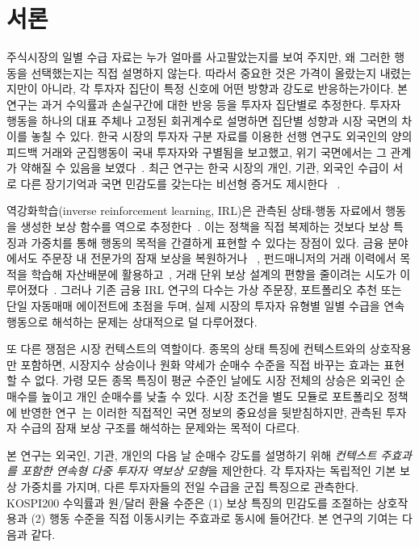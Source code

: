\documentclass[sigconf,nonacm]{acmart}
\begin{document}
\maketitle

\section{서론}

주식시장의 일별 수급 자료는 누가 얼마를 사고팔았는지를 보여 주지만, 왜 그러한
행동을 선택했는지는 직접 설명하지 않는다. 따라서 중요한 것은 가격이 올랐는지
내렸는지만이 아니라, 각 투자자 집단이 특정 신호에 어떤 방향과 강도로 반응하는가이다.
본 연구는 과거 수익률과 손실구간에 대한 반응 등을 투자자 집단별로 추정한다.
투자자 행동을 하나의 대표 주체나 고정된 회귀계수로 설명하면 집단별 성향과 시장
국면의 차이를 놓칠 수 있다. 한국 시장의 투자자 구분 자료를 이용한 선행 연구도
외국인의 양의 피드백 거래와
군집행동이 국내 투자자와 구별됨을 보고했고, 위기 국면에서는 그 관계가 약해질 수
있음을 보였다~\cite{choe1999foreign}. 최근 연구는 한국 시장의 개인, 기관, 외국인
수급이 서로 다른 장기기억과 국면 민감도를 갖는다는 비선형 증거도 제시한다
~\cite{oh2025heterogeneity}.

역강화학습(inverse reinforcement learning, IRL)은 관측된 상태-행동 자료에서
행동을 생성한 보상 함수를 역으로 추정한다~\cite{ng2000algorithms}. 이는 정책을
직접 복제하는 것보다 보상 특징과 가중치를 통해 행동의 목적을 간결하게 표현할 수
있다는 장점이 있다. 금융 분야에서도 주문장 내 전문가의 잠재 보상을 복원하거나
~\cite{roavicens2019lob}, 펀드매니저의 거래 이력에서 목적을 학습해 자산배분에
활용하고~\cite{halperin2022combining}, 거래 단위 보상 설계의 편향을 줄이려는
시도가 이루어졌다~\cite{sun2023transaction}. 그러나 기존 금융 IRL 연구의 다수는
가상 주문장, 포트폴리오 추천 또는 단일 자동매매 에이전트에 초점을 두며, 실제 시장의
투자자 유형별 일별 수급을 연속 행동으로 해석하는 문제는 상대적으로 덜 다루어졌다.

또 다른 쟁점은 시장 컨텍스트의 역할이다. 종목의 상태 특징에 컨텍스트와의
상호작용만 포함하면, 시장지수 상승이나 원화 약세가 순매수 수준을 직접 바꾸는 효과는
표현할 수 없다. 가령 모든 종목 특징이 평균 수준인 날에도 시장 전체의 상승은
외국인 순매수를 높이고 개인 순매수를 낮출 수 있다. 시장 조건을 별도 모듈로
포트폴리오 정책에 반영한 연구~\cite{wang2021deeptrader}는 이러한 직접적인 국면
정보의 중요성을 뒷받침하지만, 관측된 투자자 수급의 잠재 보상 구조를 해석하는
문제와는 목적이 다르다.

본 연구는 외국인, 기관, 개인의 다음 날 순매수 강도를 설명하기 위해
\emph{컨텍스트 주효과를 포함한 연속형 다중 투자자 역보상 모형}을 제안한다. 각
투자자는 독립적인 기본 보상 가중치를 가지며, 다른 투자자들의 전일 수급을 군집
특징으로 관측한다. KOSPI200 수익률과 원/달러 환율 수준은 (1) 보상 특징의 민감도를
조절하는 상호작용과 (2) 행동 수준을 직접 이동시키는 주효과로 동시에 들어간다.
본 연구의 기여는 다음과 같다.
\end{document}
